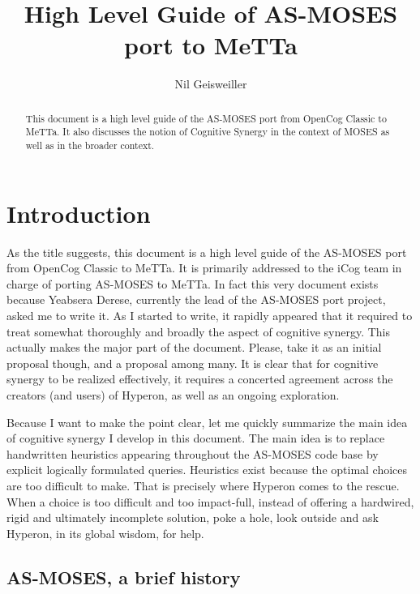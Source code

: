 \documentclass[]{report}
\begin{document}
\title{High Level Guide of AS-MOSES port to MeTTa}
\author{Nil Geisweiller}
\maketitle

\begin{abstract}
This document is a high level guide of the AS-MOSES port from OpenCog
Classic to MeTTa.  It also discusses the notion of Cognitive Synergy
in the context of MOSES as well as in the broader context.
\end{abstract}

\tableofcontents

\chapter{Introduction}

As the title suggests, this document is a high level guide of the
AS-MOSES port from OpenCog Classic to MeTTa.  It is primarily
addressed to the iCog team in charge of porting AS-MOSES to MeTTa.  In
fact this very document exists because Yeabsera Derese, currently the
lead of the AS-MOSES port project, asked me to write it.  As I started
to write, it rapidly appeared that it required to treat somewhat
thoroughly and broadly the aspect of cognitive synergy.  This actually
makes the major part of the document.  Please, take it as an initial
proposal though, and a proposal among many.  It is clear that for
cognitive synergy to be realized effectively, it requires a concerted
agreement across the creators (and users) of Hyperon, as well as an
ongoing exploration.

Because I want to make the point clear, let me quickly summarize the
main idea of cognitive synergy I develop in this document.  The main
idea is to replace handwritten heuristics appearing throughout the
AS-MOSES code base by explicit logically formulated queries.
Heuristics exist because the optimal choices are too difficult to
make.  That is precisely where Hyperon comes to the rescue.  When a
choice is too difficult and too impact-full, instead of offering a
hardwired, rigid and ultimately incomplete solution, poke a hole, look
outside and ask Hyperon, in its global wisdom, for help.

\section{AS-MOSES, a brief history}
\end{document}
